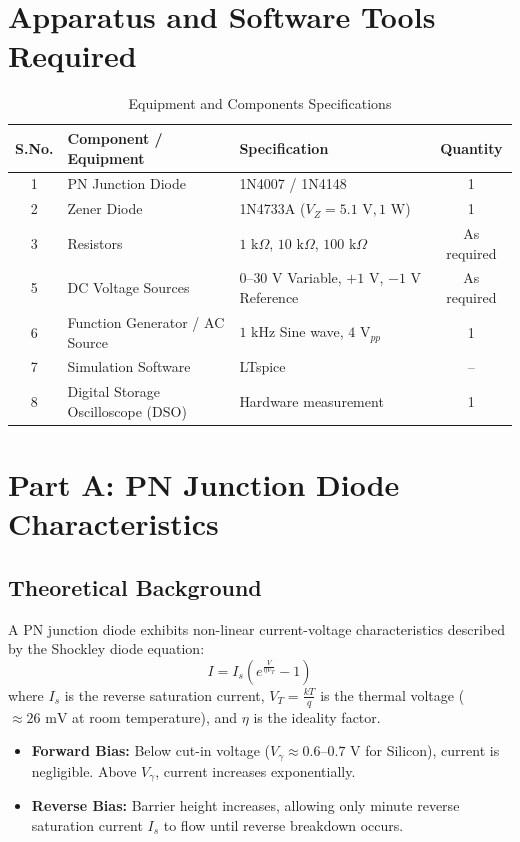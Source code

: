 \documentclass[11pt,a4paper]{article}
\begin{document}
\section{Apparatus and Software Tools Required}
\begin{table}[H]
\centering
\caption{Equipment and Components Specifications}
\begin{tabular}{cllc}
\toprule
\textbf{S.No.} & \textbf{Component / Equipment} & \textbf{Specification} & \textbf{Quantity} \\
\midrule
1 & PN Junction Diode & 1N4007 / 1N4148 & 1 \\
2 & Zener Diode & 1N4733A ($V_Z = 5.1\text{ V}, 1\text{ W}$) & 1 \\
3 & Resistors & $1\text{ k}\Omega$, $10\text{ k}\Omega$, $100\text{ k}\Omega$ & As required \\
5 & DC Voltage Sources & $0$--$30\text{ V}$ Variable, $+1\text{ V}$, $-1\text{ V}$ Reference & As required \\
6 & Function Generator / AC Source & $1\text{ kHz}$ Sine wave, $4\text{ V}_{pp}$ & 1 \\
7 & Simulation Software & LTspice & -- \\
8 & Digital Storage Oscilloscope (DSO) & Hardware measurement & 1 \\
\bottomrule
\end{tabular}
\end{table}
\section{Part A: PN Junction Diode Characteristics}
\subsection{Theoretical Background}
A PN junction diode exhibits non-linear current-voltage characteristics described by the Shockley diode equation:
\begin{equation}
I = I_s \left( e^{\frac{V}{\eta V_T}} - 1 \right)
\end{equation}
where $I_s$ is the reverse saturation current, $V_T = \frac{k T}{q}$ is the thermal voltage ($\approx 26\text{ mV}$ at room temperature), and $\eta$ is the ideality factor.
\begin{itemize}
    \item \textbf{Forward Bias:} Below cut-in voltage (\textbf{$V_\gamma \approx 0.6\text{--}0.7\text{ V}$} for Silicon), current is negligible. Above \textbf{$V_\gamma$}, current increases exponentially.
    \item \textbf{Reverse Bias:} Barrier height increases, allowing only minute reverse saturation current \textbf{$I_s$} to flow until reverse breakdown occurs.
\end{itemize}
\end{document}
